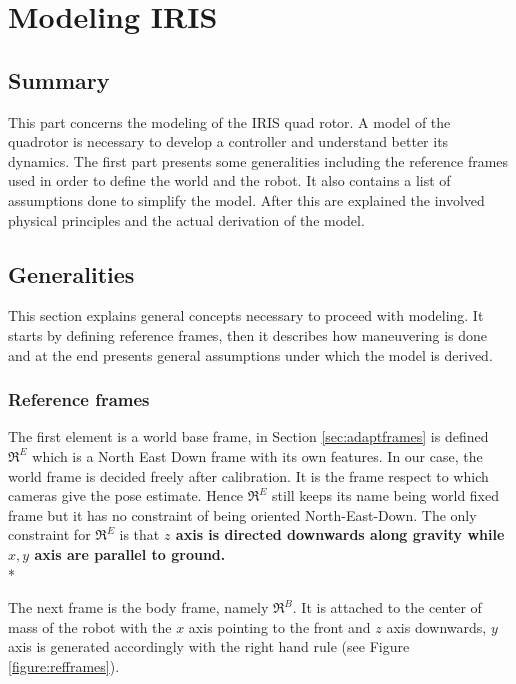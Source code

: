 
\chapter{Modeling IRIS}
\label{chap:fourth
}
\ifpdf
    \graphicspath{{Chapter4/Figures/PNG/}{Chapter4/Figures/PDF/}{Chapter4/Figures/}}
\else
    \graphicspath{{Chapter4/Figures/EPS/}{Chapter4/Figures/}}
\fi

\section*{Summary}

This part concerns the modeling of the IRIS quad rotor. A model of the quadrotor is necessary to develop a controller and understand better its dynamics. The first part presents some generalities including the reference frames used in order to define the world and the robot. It also contains a list of assumptions done to simplify the model. After this are explained the involved physical principles and the actual derivation of the model.

\section{Generalities}

This section explains general concepts necessary to proceed with modeling. It starts by defining reference frames, then it describes how maneuvering is done and at the end presents general assumptions under which the model is derived.

\subsection{Reference frames}
\label{sec:refframes}
The first element is a world base frame, in Section \ref{sec:adaptframes} is defined $\Re^E$ which is a North East Down frame with its own features. In our case, the world frame is decided freely after calibration. It is the frame respect to which cameras give the pose estimate. Hence $\Re^E$ still keeps its name being world fixed frame but it has no constraint of being oriented North-East-Down. The only constraint for $\Re^E$ is that \textbf{$z$ axis is directed downwards along gravity while $x , y$ axis are parallel to ground.} \\*

\noindent
The next frame is the body frame, namely $\Re^B$. It is attached to the center of mass of the robot with the $x$ axis pointing to the front and $z$ axis downwards, $y$ axis is generated accordingly with the right hand rule (see Figure \ref{figure:refframes}).

